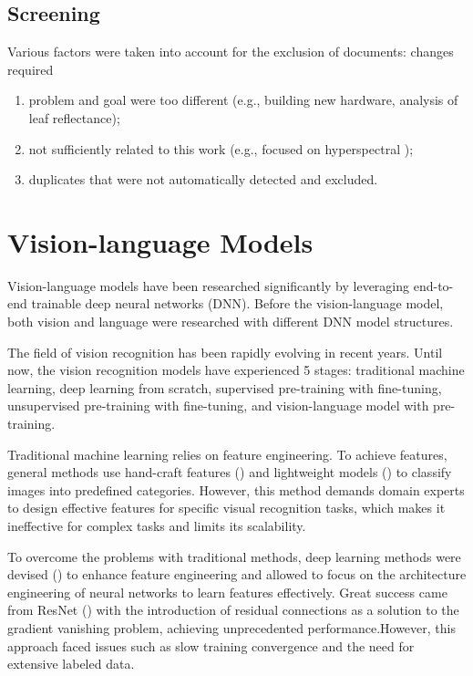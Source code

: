 \subsection{Screening}

Various factors were taken into account for the exclusion of documents:
{\color{red} changes required}
\begin{enumerate}
    \item problem and goal were too different (e.g., building new hardware, analysis of leaf reflectance);
    \item not sufficiently related to this work (e.g., focused on hyperspectral );
    \item duplicates that were not automatically detected and excluded.
\end{enumerate}


\section{Vision-language Models}
Vision-language models have been researched significantly by leveraging end-to-end trainable deep neural networks (DNN). Before the vision-language model, both vision and language were researched with different DNN model structures. 

The field of vision recognition has been rapidly evolving in recent years. Until now, the vision recognition models have experienced 5 stages: traditional machine learning, deep learning from scratch, supervised pre-training with fine-tuning, unsupervised pre-training with fine-tuning, and vision-language model with pre-training.

Traditional machine learning relies on feature engineering. To achieve features, general methods use hand-craft features (\cite{svmclassification}) and lightweight models (\cite{knn, svm}) to classify images into predefined categories. However, this method demands domain experts to design effective features for specific visual recognition tasks, which makes it ineffective for complex tasks and limits its scalability.

To overcome the problems with traditional methods, deep learning methods were devised (\cite{imagenet, dnn_imagerecognition}) to enhance feature engineering and allowed to focus on the architecture engineering of neural networks to learn features effectively. Great success came from ResNet (\cite{resnet}) with the introduction of residual connections as a solution to the gradient vanishing problem, achieving unprecedented performance.However, this approach faced issues such as slow training convergence and the need for extensive labeled data. 

